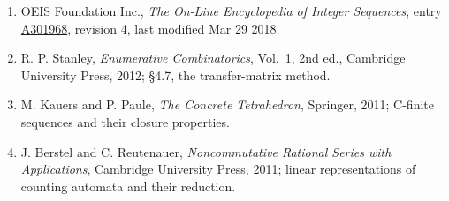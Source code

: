\documentclass[11pt]{article}
\theoremstyle{definition}
\begin{document}
\begin{enumerate}

\item OEIS Foundation Inc., \emph{The On-Line Encyclopedia of Integer Sequences}, entry \href{https://oeis.org/A301968}{A301968}, revision 4, last modified Mar 29 2018.

\item R. P. Stanley, \emph{Enumerative Combinatorics}, Vol.~1, 2nd ed., Cambridge University Press, 2012; \S4.7, the transfer-matrix method.

\item M. Kauers and P. Paule, \emph{The Concrete Tetrahedron}, Springer, 2011; C-finite sequences and their closure properties.

\item J. Berstel and C. Reutenauer, \emph{Noncommutative Rational Series with Applications}, Cambridge University Press, 2011; linear representations of counting automata and their reduction.

\end{enumerate}
\end{document}
